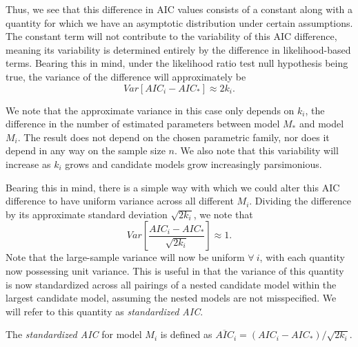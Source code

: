 		Thus, we see that this difference in AIC values consists of a constant along with a quantity for which we have an asymptotic distribution under certain
		assumptions. The constant term will not contribute to the variability of this AIC difference, meaning its variability is determined entirely by the
		difference in likelihood-based terms. Bearing this in mind, under the likelihood ratio test null hypothesis being true, the variance of the difference
		will approximately be
		\begin{equation*}
			Var[AIC_i - AIC_*] \approx 2 k_i .
		\end{equation*}

		We note that the approximate variance in this case only depends on $k_i$, the difference in the number of estimated parameters between model $M_*$ and model $M_i$. The result does not
		depend on the chosen parametric family, nor does it depend in any way on the sample size $n$. We also note that this variability will increase as $k_i$ grows and candidate
		models grow increasingly parsimonious.

		Bearing this in mind, there is a simple way with which we could alter this AIC difference to have uniform variance across all different $M_i$. Dividing the difference
		by its approximate standard deviation $\sqrt{2 k_i}$, we note that
		\begin{equation*}
			Var \left[ \frac{AIC_i - AIC_*}{\sqrt{2k_i}} \right] \approx 1 .
		\end{equation*}
		Note that the large-sample variance will now be uniform $\forall\: i$, with each quantity now possessing unit variance. This is useful in that the variance of this quantity is now standardized
		across all pairings of a nested candidate model within the largest candidate model, assuming the nested models are not misspecified. We will refer to this quantity as
		\textit{standardized AIC}.

		\begin{definition}
			The \textit{standardized AIC} for model $M_i$ is defined as $\overline{AIC}_i = (AIC_i - AIC_*) / \sqrt{2k_i}$.
		\end{definition}

